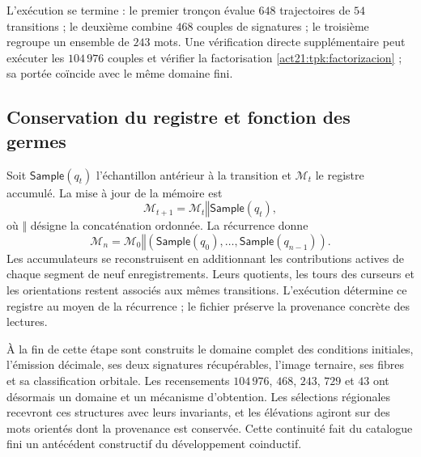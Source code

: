 L'exécution se termine : le premier tronçon évalue \(648\) trajectoires de \(54\) transitions ; le deuxième combine \(468\) couples de signatures ; le troisième regroupe un ensemble de \(243\) mots. Une vérification directe supplémentaire peut exécuter les \(104\,976\) couples et vérifier la factorisation \eqref{act21:tpk:factorizacion} ; sa portée coïncide avec le même domaine fini.

\subsection{Conservation du registre et fonction des germes}
\label{act21:tpk:conclusion}

Soit \(\mathsf{Sample}(q_t)\) l'échantillon antérieur à la transition et \(\mathcal M_t\) le registre accumulé. La mise à jour de la mémoire est
\begin{equation}
 \mathcal M_{t+1}=\mathcal M_t\mathbin{\Vert}\mathsf{Sample}(q_t),
 \label{act21:tpk:archivo}
\end{equation}
où \(\Vert\) désigne la concaténation ordonnée. La récurrence donne
\[
 \mathcal M_n=\mathcal M_0\mathbin{\Vert}
 (\mathsf{Sample}(q_0),\ldots,\mathsf{Sample}(q_{n-1})).
\]
Les accumulateurs se reconstruisent en additionnant les contributions actives de
chaque segment de neuf enregistrements. Leurs quotients, les tours des
curseurs et les orientations restent associés aux mêmes transitions.
L'exécution détermine ce registre au moyen de la récurrence ; le fichier
préserve la provenance concrète des lectures.

À la fin de cette étape sont construits le domaine complet des conditions
initiales, l'émission décimale, ses deux signatures récupérables, l'image ternaire,
ses fibres et sa classification orbitale. Les recensements \(104\,976\), \(468\),
\(243\), \(729\) et \(43\) ont désormais un domaine et un mécanisme d'obtention.
Les sélections régionales recevront ces structures avec leurs invariants,
et les élévations agiront sur des mots orientés dont la provenance est
conservée. Cette continuité fait du catalogue fini un antécédent
constructif du développement coinductif.
